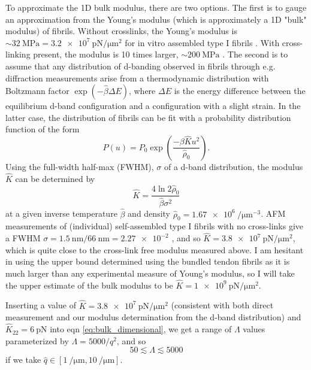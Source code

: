 \documentclass[12pt]{article}
\begin{document}
To approximate the 1D bulk modulus, there are two options. The first is to gauge an approximation from the Young's modulus (which is approximately a 1D "bulk" modulus) of fibrils. Without crosslinks, the Young's modulus is $\sim\SI{32}{\mega\pascal}=\SI{3.2e7}{\pico\newton\per\micro\meter^2}$ for in vitro assembled type I fibrils \cite{Graham:2004bl}. With cross-linking present, the modulus is 10 times larger, $\sim\SI{200}{\mega\pascal}$ \cite{vanderRijt:2006bt}. The second is to assume that any distribution of d-banding observed in fibrils through e.g. diffraction measurements arise from a thermodynamic distribution with Boltzmann factor $\exp(-\hat{\beta}\Delta E)$, where $\Delta E$ is the energy difference between the equilibrium d-band configuration and a configuration with a slight strain. In the latter case, the distribution of fibrils can be fit with a probability distribution function of the form
\begin{equation}\label{eq:dbandpdf}
P(u)=P_0\exp\left(\frac{-\beta\hat{K}u^2}{\hat{\rho}_0}\right).
\end{equation}
Using the full-width half-max (FWHM), $\sigma$ of a d-band distribution, the modulus $\hat{K}$ can be determined by
\begin{equation}\label{eq:FWHM}
\hat{K}=\frac{4\ln2\hat{\rho}_0}{\hat{\beta}\sigma^2}
\end{equation}
at a given inverse temperature $\hat{\beta}$ and density $\hat{\rho}_0=\SI{1.67e6}{\per\micro\meter^{-3}}$. AFM measurements of (individual) self-assembled type I fibrils with no cross-links give a FWHM $\sigma=\SI{1.5}{\nano\meter}/\SI{66}{\nano\meter}=\num{2.27e-2}$ \cite{Fang:2013ba}, and so $\hat{K}=\SI{3.8e7}{\pico\newton\per\micro\meter^2}$, which is quite close to the cross-link free modulus measured above. I am hesitant in using the upper bound determined using the bundled tendon fibrils as it is much larger than any experimental measure of Young's modulus, so I will take the upper estimate of the bulk modulus to be $\hat{K}=\SI{1e9}{\pico\newton\per\micro\meter\squared}$.

Inserting a value of $\hat{K}=\SI{3.8e7}{\pico\newton\per\micro\meter^2}$ (consistent with both direct measurement and our modulus determination from the d-band distribution) and $\hat{K}_{22}=\SI{6}{\pico\newton}$ into eqn \ref{eq:bulk_dimensional}, we get a range of $\Lambda$ values parameterized by $\Lambda=5000/q^2$, and so
\begin{equation}\label{eq:Lambda}
50\lesssim\Lambda\lesssim5000
\end{equation}
if we take $\hat{q}\in[\SI{1}{\per\micro\meter},\SI{10}{\per\micro\meter}]$.
\clearpage


\end{document}
